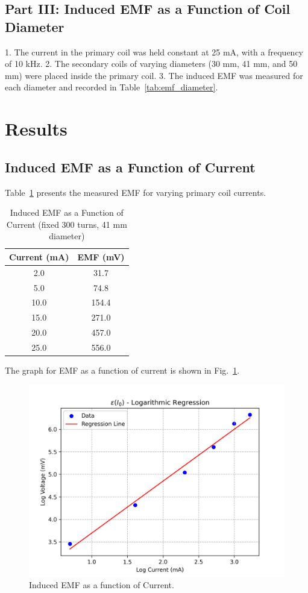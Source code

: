\documentclass[journal]{IEEEtran}
\begin{document}
\subsection{Part III: Induced EMF as a Function of Coil Diameter}
1. The current in the primary coil was held constant at 25 mA, with a frequency of 10 kHz.
2. The secondary coils of varying diameters (30 mm, 41 mm, and 50 mm) were placed inside the primary coil.
3. The induced EMF was measured for each diameter and recorded in Table~\ref{tab:emf_diameter}.

\section{Results}
\subsection{Induced EMF as a Function of Current}
Table~\ref{tab:emf_current} presents the measured EMF for varying primary coil currents.

\begin{table}[H]
    \centering
    \caption{Induced EMF as a Function of Current (fixed 300 turns, 41 mm diameter)}
    \begin{tabular}{cc}
        \hline
        Current (mA) & EMF (mV) \\ \hline
        2.0 & 31.7 \\
        5.0 & 74.8 \\
        10.0 & 154.4 \\
        15.0 & 271.0 \\
        20.0 & 457.0 \\ 
        25.0 & 556.0 \\ \hline
    \end{tabular}
    \label{tab:emf_current}
\end{table}

The graph for EMF as a function of current is shown in Fig.~\ref{fig:epsilon_current}.

\begin{figure}[H]
    \centering
    \includegraphics[width=0.9\linewidth]{output_plots/epsilonI_0.png}
    \caption{Induced EMF as a function of Current.}
    \label{fig:epsilon_current}
\end{figure}
\end{document}
